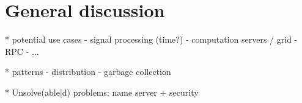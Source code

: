 \section{General discussion}

* potential use cases
  - signal processing (time?)
  - computation servers / grid
  - RPC
  - ...

* patterns
  - distribution
  - garbage collection

* Unsolve(able|d) problems: name server + security
